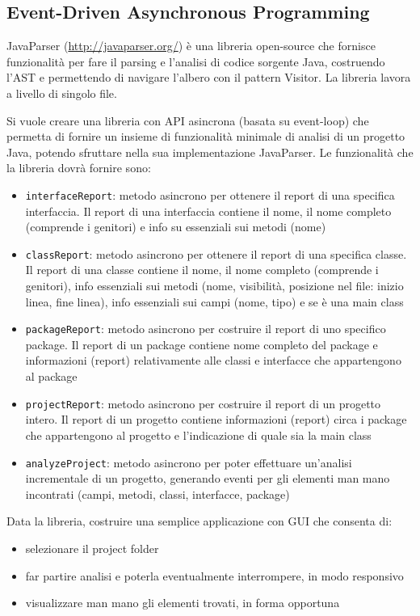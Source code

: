 \documentclass[12pt,a4paper,openright,twoside]{book}
\begin{document}
\subsection{Event-Driven Asynchronous Programming}
JavaParser (\href{http://javaparser.org/}{http://javaparser.org/}) è una libreria open-source che fornisce funzionalità per fare il parsing e l'analisi di codice sorgente Java, costruendo l'AST e permettendo di navigare l'albero  con il pattern Visitor. La libreria lavora a livello di singolo file.

Si vuole creare una libreria con API asincrona (basata su event-loop) che permetta di fornire un insieme di funzionalità minimale di analisi di un progetto Java, potendo sfruttare nella sua implementazione JavaParser. 
Le funzionalità che la libreria dovrà fornire sono:
\begin{itemize}
    \item \texttt{interfaceReport}: metodo asincrono per ottenere il report di una specifica interfaccia. Il report di una interfaccia contiene il nome, il nome completo (comprende i genitori) e info su essenziali sui metodi (nome)
    \item \texttt{classReport}: metodo asincrono per ottenere il report di una specifica classe. Il report di una classe contiene il nome, il nome completo (comprende i genitori), info essenziali sui metodi (nome, visibilità, posizione nel file: inizio linea, fine linea), info essenziali sui campi (nome, tipo) e se è una main class
    \item \texttt{packageReport}: metodo asincrono per costruire il report di uno specifico package. Il report di un package contiene nome completo del package e informazioni (report) relativamente alle classi e interfacce che appartengono al package
    \item \texttt{projectReport}: metodo asincrono per costruire il report di un progetto intero. Il report di un progetto contiene informazioni (report) circa i package che appartengono al progetto e l'indicazione di quale sia la main class
    \item \texttt{analyzeProject}: metodo asincrono per poter effettuare un'analisi incrementale di un progetto, generando eventi per gli elementi man mano incontrati (campi, metodi, classi, interfacce, package)

\end{itemize}


Data la libreria, costruire una semplice applicazione con GUI che consenta di:
\begin{itemize}
    \item selezionare il project folder
    \item far partire analisi e poterla eventualmente interrompere, in modo responsivo
    \item visualizzare man mano gli elementi trovati, in forma opportuna
\end{itemize}
\end{document}
